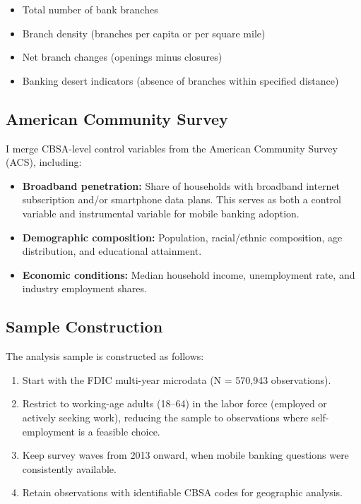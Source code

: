 \documentclass[12pt]{article}
\begin{document}
\begin{itemize}
    \item Total number of bank branches
    \item Branch density (branches per capita or per square mile)
    \item Net branch changes (openings minus closures)
    \item Banking desert indicators (absence of branches within specified distance)
\end{itemize}

\subsection{American Community Survey}

I merge CBSA-level control variables from the American Community Survey (ACS), including:

\begin{itemize}
    \item \textbf{Broadband penetration:} Share of households with broadband internet subscription and/or smartphone data plans. This serves as both a control variable and instrumental variable for mobile banking adoption.

    \item \textbf{Demographic composition:} Population, racial/ethnic composition, age distribution, and educational attainment.

    \item \textbf{Economic conditions:} Median household income, unemployment rate, and industry employment shares.
\end{itemize}

\subsection{Sample Construction}

The analysis sample is constructed as follows:

\begin{enumerate}
    \item Start with the FDIC multi-year microdata (N = 570,943 observations).

    \item Restrict to working-age adults (18--64) in the labor force (employed or actively seeking work), reducing the sample to observations where self-employment is a feasible choice.

    \item Keep survey waves from 2013 onward, when mobile banking questions were consistently available.

    \item Retain observations with identifiable CBSA codes for geographic analysis.
\end{enumerate}
\end{document}
